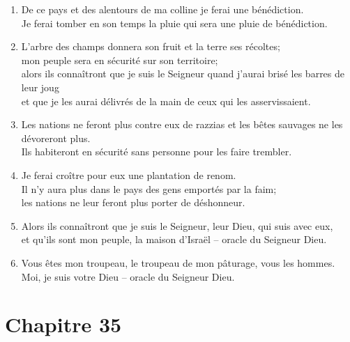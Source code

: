 \begin{enumerate}[leftmargin=\psleftmargin, labelsep = \pslabelsep, label={\arabic*}, font=\color{\pscolor}\small\textsuperscript, parsep=0em, itemsep=0em, topsep=0em ]
    \item De ce pays et des alentours de ma colline je ferai une bénédiction. \\ Je ferai tomber en son temps la pluie qui sera une pluie de bénédiction.
    \item L’arbre des champs donnera son fruit et la terre ses récoltes; \\ mon peuple sera en sécurité sur son territoire; \\ alors ils connaîtront que je suis le Seigneur quand j’aurai brisé les barres de leur joug \\ et que je les aurai délivrés de la main de ceux qui les asservissaient.
    \item Les nations ne feront plus contre eux de razzias et les bêtes sauvages ne les dévoreront plus. \\ Ils habiteront en sécurité sans personne pour les faire trembler.
    \item Je ferai croître pour eux une plantation de renom. \\ Il n’y aura plus dans le pays des gens emportés par la faim; \\ les nations ne leur feront plus porter de déshonneur.
    \item Alors ils connaîtront que je suis le Seigneur, leur Dieu, qui suis avec eux, \\ et qu’ils sont mon peuple, la maison d’Israël – oracle du Seigneur Dieu.
    \item Vous êtes mon troupeau, le troupeau de mon pâturage, vous les hommes. \\ Moi, je suis votre Dieu – oracle du Seigneur Dieu.
\end{enumerate}
\newpage


\section*{Chapitre 35}
